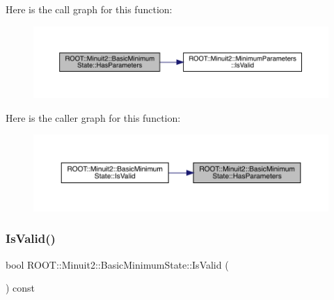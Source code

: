 Here is the call graph for this function\+:
\nopagebreak
\begin{figure}[H]
\begin{center}
\leavevmode
\includegraphics[width=350pt]{d0/db1/classROOT_1_1Minuit2_1_1BasicMinimumState_a1af83c0464c727dc173834c1612f5e49_cgraph}
\end{center}
\end{figure}
Here is the caller graph for this function\+:
\nopagebreak
\begin{figure}[H]
\begin{center}
\leavevmode
\includegraphics[width=350pt]{d0/db1/classROOT_1_1Minuit2_1_1BasicMinimumState_a1af83c0464c727dc173834c1612f5e49_icgraph}
\end{center}
\end{figure}
\mbox{\label{classROOT_1_1Minuit2_1_1BasicMinimumState_af92e32efe08fa047bc433db6f058d11a}} 
\subsubsection{\texorpdfstring{IsValid()}{IsValid()}\hspace{0.1cm}{\footnotesize\ttfamily [1/3]}}
{\footnotesize\ttfamily bool R\+O\+O\+T\+::\+Minuit2\+::\+Basic\+Minimum\+State\+::\+Is\+Valid (\begin{DoxyParamCaption}{ }\end{DoxyParamCaption}) const\hspace{0.3cm}{\ttfamily [inline]}}

